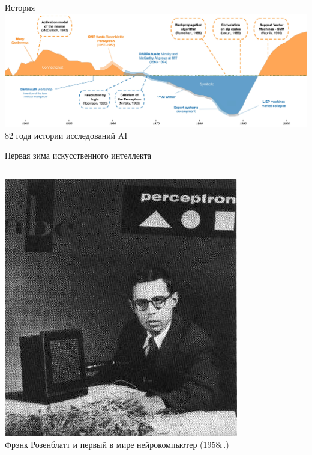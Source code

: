 \documentclass[aspectratio=169, professionalfonts]{beamer}
\begin{document}
\begin{frame}{История}
    \centering
    \includegraphics[width=\linewidth]{graphs/fig22.jpg} \\
    82 года истории исследований AI
\end{frame}

\begin{frame}{Первая зима искусственного интеллекта}
    \begin{columns}
        \begin{column}{.49\linewidth}
            \centering
            \includegraphics[width=.75\linewidth]{graphs/fig23_1.jpg} \\
            Фрэнк Розенблатт и первый в мире нейрокомпьютер (1958г.)
        \end{column}
        \pause
        \begin{column}{.49\linewidth}
            \centering

\end{column}
\end{columns}
\end{frame}
\end{document}
